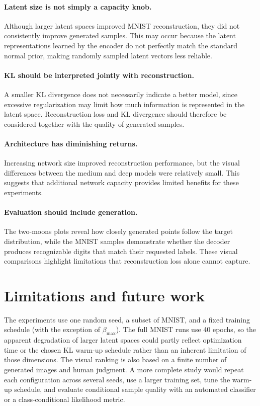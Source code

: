 \documentclass[11pt]{article}
\begin{document}
\paragraph{Latent size is not simply a capacity knob.}
Although larger latent spaces improved MNIST reconstruction,
they did not consistently improve generated samples.
This may occur because the latent representations learned by
the encoder do not perfectly match the standard normal prior,
making randomly sampled latent vectors less reliable.

\paragraph{KL should be interpreted jointly with reconstruction.}
A smaller KL divergence does not necessarily indicate a better
model, since excessive regularization may limit how much
information is represented in the latent space. Reconstruction
loss and KL divergence should therefore be considered together
with the quality of generated samples.

\paragraph{Architecture has diminishing returns.}
Increasing network size improved reconstruction performance,
but the visual differences between the medium and deep models
were relatively small. This suggests that additional network
capacity provides limited benefits for these experiments.

\paragraph{Evaluation should include generation.}
The two-moons plots reveal how closely generated points follow
the target distribution, while the MNIST samples demonstrate
whether the decoder produces recognizable digits that match
their requested labels. These visual comparisons highlight
limitations that reconstruction loss alone cannot capture.

\section{Limitations and future work}

The experiments use one random seed, a subset of MNIST, and a fixed training
schedule (with the exception of $\beta_{\max}$). The full MNIST runs use 40 epochs, so the apparent degradation of
larger latent spaces could partly reflect optimization time or the chosen
KL warm-up schedule rather than an inherent limitation of those dimensions.
The visual ranking is also based on a finite number of generated images and
human judgment. A more complete study would repeat each configuration across
several seeds, use a larger training set, tune the warm-up schedule, and
evaluate conditional sample quality with an automated classifier or a
class-conditional likelihood metric.
\end{document}
